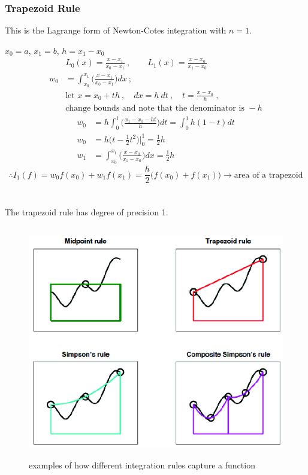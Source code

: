 \documentclass[12pt]{exam}
\begin{document}
\subsubsection*{Trapezoid Rule}
This is the Lagrange form of Newton-Cotes integration with $n=1$.

$x_0 = a$, $x_1 = b$, $h = x_1 - x_0$
%
\begin{align*}
&L_0(x) = \frac{x-x_1}{x_0-x_1}\:, \qquad L_1(x) = \frac{x-x_0}{x_1-x_0} \\
%
w_0 &= \int_{x_0}^{x_1} \bigl(\frac{x-x_1}{x_0-x_1}\bigr) dx\:; 
\\ &\text{let } x = x_0 + th  \:, \quad dx = h\:dt\:, \quad t = \frac{x-x_0}{h}\:,\\
&\text{change bounds and note that the denominator is }-h 
\end{align*}
\begin{align*}
w_0 &= h \int_0^1 \bigl(\frac{x_1 - x_0 - ht}{h}\bigr)dt = \int_0^1 h(1-t)dt \\
%
w_0 &= h\bigl(t - \frac{1}{2}t^2 \bigr) |_0^1 = \frac{1}{2}h\\
%
w_1 &= \int_{x_0}^{x_1} \bigl(\frac{x-x_0}{x_1-x_0}\bigr) dx = \frac{1}{2}h
%
\end{align*}
\ifprintanswers
\[\therefore I_1(f) = w_0f(x_0) + w_1f(x_1)  = \boxed{\frac{h}{2}\bigl(f(x_0) + f(x_1)\bigr)} \rightarrow \text{area of a trapezoid}
\]
\else
\\\vspace*{2em}\\
\fi
%
The trapezoid rule has degree of precision 1.

\begin{figure}
\begin{center}
  \includegraphics[height=4in,clip]{QuadratureComparison}
\end{center}
\caption{examples of how different integration rules capture a function}
\end{figure}
\end{document}
